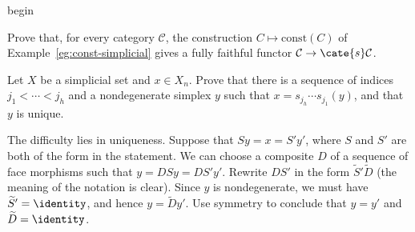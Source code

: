 
\hypertarget{o014.aljabr2.chapter8.exercises-a}{ }
\csname begin
	\item Prove that, for every category $\mathcal{C}$, the construction
	$C\mapsto\mathrm{const}(C)$ of Example~\ref{eg:const-simplicial} gives a
	fully faithful functor $\mathcal{C}\to\cate{s}\mathcal{C}$.

	\item Let $X$ be a simplicial set and $x\in X_n$. Prove that there is a
	sequence of indices $j_1<\cdots<j_h$ and a nondegenerate simplex $y$ such
	that $x=s_{j_h}\cdots s_{j_1}(y)$, and that $y$ is unique.

	\begin{hint}
		The difficulty lies in uniqueness. Suppose that $Sy=x=S'y'$, where
		$S$ and $S'$ are both of the form in the statement. We can choose a
		composite $D$ of a sequence of face morphisms such that
		$y=DSy=DS'y'$. Rewrite $DS'$ in the form
		$\widetilde{S}'\widetilde{D}$ (the meaning of the notation is clear).
		Since $y$ is nondegenerate, we must have
		$\widetilde{S}'=\identity$, and hence $y=\widetilde{D}y'$. Use symmetry
		to conclude that $y=y'$ and $\widetilde{D}=\identity$.
	\end{hint}

